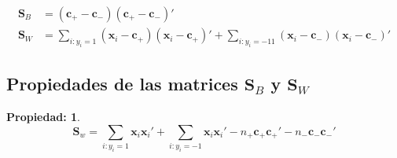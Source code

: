 \documentclass[paper=letter, fontsize=11pt]{scrartcl}
\newtheorem{thmp}{Propiedad:}
\newcommand{\Sb}{\mathbf{S}}
\newcommand{\cb}{\mathbf{c}}
\newcommand{\xb}{\mathbf{x}}
\numberwithin{equation}{section} %
\numberwithin{figure}{section} %
\numberwithin{table}{section} %
\begin{document}
\begin{align} \label{d_matrices}
    \Sb_B &= (\cb_+-\cb_-)(\cb_+-\cb_-)'\\
    \Sb_W &=\sum_{i:y_i=1}(\xb_i-\cb_+)(\xb_i-\cb_+)'+\sum_{i:y_i=-11}(\xb_i-\cb_-)(\xb_i-\cb_-)'
\end{align}

\subsection{Propiedades de las matrices $\Sb_B$ y $\Sb_W$}
\begin{framed}
    \begin{thmp} 
    \label{a_kernel}
    $$\Sb_w=\sum_{i:y_i=1}\xb_i\xb_i'+\sum_{i:y_i=-1}\xb_i\xb_i'-n_{+}\cb_{+}\cb_{+}'-n_{-}\cb_{-}\cb_{-}'$$
    \end{thmp}
\end{framed}
\end{document}
